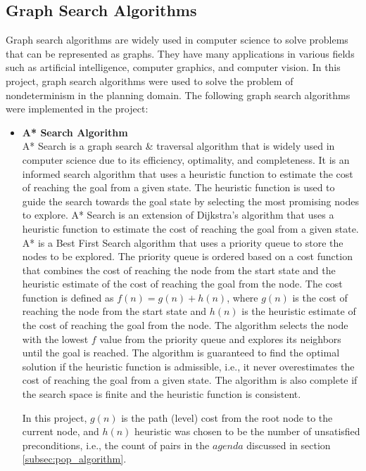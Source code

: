 \subsection{Graph Search Algorithms} \label{subsec:graph_search_algorithms}
Graph search algorithms are widely used in computer science to solve problems that can be represented as graphs. They have many applications in various fields such as artificial intelligence, computer graphics, and computer vision. In this project, graph search algorithms were used to solve the problem of nondeterminism in the planning domain.
The following graph search algorithms were implemented in the project:
\begin{itemize}

    \item \textbf{\acf{A*} Search Algorithm} \label{subsubsec:a_star} \\
          \ac{A*} Search is a graph search \& traversal algorithm that is widely used in computer science due to its efficiency, optimality, and completeness. It is an informed search algorithm that uses a heuristic function to estimate the cost of reaching the goal from a given state. The heuristic function is used to guide the search towards the goal state by selecting the most promising nodes to explore. \ac{A*} Search is an extension of Dijkstra's algorithm that uses a heuristic function to estimate the cost of reaching the goal from a given state\cite{AStarAlgorithm}. \ac{A*} is a Best First Search algorithm that uses a priority queue to store the nodes to be explored. The priority queue is ordered based on a cost function that combines the cost of reaching the node from the start state and the heuristic estimate of the cost of reaching the goal from the node. The cost function is defined as $f(n) = g(n) + h(n)$, where $g(n)$ is the cost of reaching the node from the start state and $h(n)$ is the heuristic estimate of the cost of reaching the goal from the node. The algorithm selects the node with the lowest $f$ value from the priority queue and explores its neighbors until the goal is reached. The algorithm is guaranteed to find the optimal solution if the heuristic function is admissible, i.e., it never overestimates the cost of reaching the goal from a given state. The algorithm is also complete if the search space is finite and the heuristic function is consistent.

          In this project, $g(n)$ is the path (level) cost from the root node to the current node, and $h(n)$ heuristic was chosen to be the number of unsatisfied preconditions, i.e., the count of pairs in the $agenda$ discussed in section {\ref{subsec:pop_algorithm}}.


\end{itemize}
